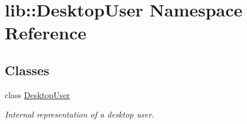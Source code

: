 \hypertarget{namespacelib_1_1DesktopUser}{\section{lib\-:\-:\-Desktop\-User \-Namespace \-Reference}
\label{namespacelib_1_1DesktopUser}
}
\subsection*{\-Classes}
\begin{DoxyCompactItemize}
\item 
class \hyperlink{classlib_1_1DesktopUser_1_1DesktopUser}{\-Desktop\-User}
\begin{DoxyCompactList}\small\item\em \-Internal representation of a desktop user. \end{DoxyCompactList}\end{DoxyCompactItemize}

